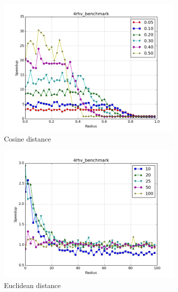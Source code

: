 \documentclass[review,preprint,12pt]{elsarticle}
\theoremstyle{definition}
\theoremstyle{remark}
\numberwithin{equation}{section}
\begin{document}
\begin{figure}[tbp]
    \centering
    \begin{subfigure}[b]{0.40\textwidth}
        \caption{Cosine distance}
        \label{fig:fragbag_cosine}
        \includegraphics[width=1\textwidth]{assets/4rhv_benchmark_cosine}
    \end{subfigure}%
    \begin{subfigure}[b]{0.40\textwidth}
        \caption{Euclidean distance}
        \label{fig:fragbag_euclid}
        \includegraphics[width=1\textwidth]{assets/4rhv_benchmark_euclid}
    \end{subfigure}
    \begin{subfigure}[b]{0.40\textwidth}

\end{subfigure}
\end{figure}
\end{document}
